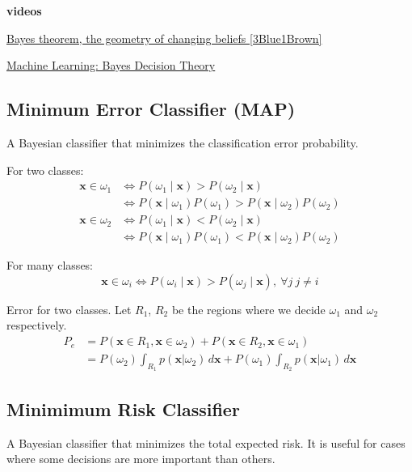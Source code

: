 \documentclass{article}
\begin{document}
\begin{multicols}{2}
\begin{mdframed}
	\textbf{videos}

	\href{https://www.youtube.com/watch?v=HZGCoVF3YvM}{Bayes theorem, the geometry of changing beliefs [3Blue1Brown]}

	\href{https://www.youtube.com/watch?v=4JscUHGWaB4}{Machine Learning: Bayes Decision Theory}
\end{mdframed}

\subsection{Minimum Error Classifier (MAP)}
A Bayesian classifier that minimizes the classification error probability.

For two classes:
\[\begin{split}
	\symbf{x} \in \omega_1 &\Leftrightarrow P(\omega_1 \mid \symbf{x}) > P(\omega_2 \mid \symbf{x}) \\
	&\Leftrightarrow P(\symbf{x} \mid \omega_1)P(\omega_1) > P(\symbf{x} \mid \omega_2)P(\omega_2)
\end{split}\]
\[\begin{split}
	\symbf{x} \in \omega_2 &\Leftrightarrow P(\omega_1 \mid \symbf{x}) < P(\omega_2 \mid \symbf{x}) \\
	&\Leftrightarrow P(\symbf{x} \mid \omega_1)P(\omega_1) < P(\symbf{x} \mid \omega_2)P(\omega_2)
\end{split}\]

For many classes:
\[\symbf{x} \in \omega_i \Leftrightarrow P(\omega_i \mid \symbf{x}) > P(\omega_j \mid \symbf{x}),\ \forall j\ j \neq i\]

Error for two classes. Let $R_1$, $R_2$ be the regions where we decide $\omega_1$ and $\omega_2$ respectively.
\[\begin{split}
	P_e &= P(\symbf{x} \in R_1, \symbf{x} \in \omega_2) + P(\symbf{x} \in R_2, \symbf{x} \in \omega_1) \\
	&= P(\omega_2) \int_{R_1} p(\symbf{x}|\omega_2) \, d\symbf{x} + P(\omega_1) \int_{R_2} p(\symbf{x}|\omega_1) \, d\symbf{x}
\end{split}\]

\subsection{Minimimum Risk Classifier}
A Bayesian classifier that minimizes the total expected risk. It is useful for cases where some decisions are more important than others.


\end{multicols}
\end{document}
